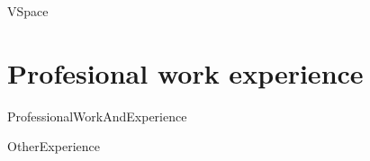

    {VSpace}

\section{Profesional work experience}


    {ProfessionalWorkAndExperience}


    {OtherExperience}

